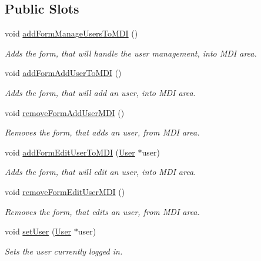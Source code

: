 \subsection*{\-Public \-Slots}
\begin{DoxyCompactItemize}
\item 
void \hyperlink{class_main_window_aa6983780d1dbf4e406a037e058bc3032}{add\-Form\-Manage\-Users\-To\-M\-D\-I} ()
\begin{DoxyCompactList}\small\item\em \-Adds the form, that will handle the user management, into \-M\-D\-I area. \end{DoxyCompactList}\item 
void \hyperlink{class_main_window_a5ae42a8841868c94ee792e4c8859e4b4}{add\-Form\-Add\-User\-To\-M\-D\-I} ()
\begin{DoxyCompactList}\small\item\em \-Adds the form, that will add an user, into \-M\-D\-I area. \end{DoxyCompactList}\item 
void \hyperlink{class_main_window_adac35805d02f717ae262cec24c403303}{remove\-Form\-Add\-User\-M\-D\-I} ()
\begin{DoxyCompactList}\small\item\em \-Removes the form, that adds an user, from \-M\-D\-I area. \end{DoxyCompactList}\item 
void \hyperlink{class_main_window_a1897b0812e32229ec9a4d4c92aebfd2c}{add\-Form\-Edit\-User\-To\-M\-D\-I} (\hyperlink{class_user}{\-User} $\ast$user)
\begin{DoxyCompactList}\small\item\em \-Adds the form, that will edit an user, into \-M\-D\-I area. \end{DoxyCompactList}\item 
void \hyperlink{class_main_window_a8306654165b9f9020bbf08208d8e0c95}{remove\-Form\-Edit\-User\-M\-D\-I} ()
\begin{DoxyCompactList}\small\item\em \-Removes the form, that edits an user, from \-M\-D\-I area. \end{DoxyCompactList}\item 
void \hyperlink{class_main_window_ad9f37398d16c551d5daf0df7a474a772}{set\-User} (\hyperlink{class_user}{\-User} $\ast$user)
\begin{DoxyCompactList}\small\item\em \-Sets the user currently logged in. \end{DoxyCompactList}\item 

\end{DoxyCompactItemize}
